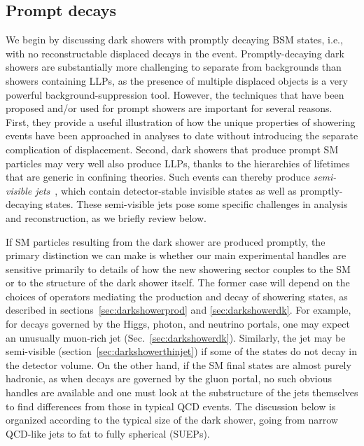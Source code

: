 \subsection{Prompt decays}
\label{sec:darkshowerprompt}

 We begin by discussing dark showers with promptly decaying BSM states, i.e., with no reconstructable displaced decays in the event.  Promptly-decaying dark showers are substantially more challenging to separate from backgrounds than showers containing LLPs, as the presence of multiple displaced objects is a very powerful background-suppression tool.  However, the techniques that have been proposed and/or used for prompt showers are important for several reasons. First, they provide a useful illustration of how the unique properties of showering events have been approached in analyses to date without introducing the separate complication of displacement.  Second, dark showers that produce prompt SM particles may very well also produce LLPs, thanks to the hierarchies of lifetimes that are generic in confining theories.  Such events can thereby produce {\em semi-visible jets}~\cite{Cohen:2015toa}, which contain detector-stable invisible states as well as promptly-decaying states.  These semi-visible jets pose some specific challenges in analysis and reconstruction, as we briefly review below.

If SM particles resulting from the dark shower are produced promptly, the primary distinction we can make is whether our main experimental handles are sensitive primarily to details of how the new showering sector couples to the SM or to the structure of the dark shower itself.
The former case will depend on the
choices of operators mediating the production and decay of showering states, as described in sections~\ref{sec:darkshowerprod} and \ref{sec:darkshowerdk}.
For example, for decays governed by the Higgs, photon, and neutrino portals, one may expect an unusually muon-rich jet (Sec.~\ref{sec:darkshowerdk}). Similarly, the jet may be semi-visible (section~\ref{sec:darkshowerthinjet}) if some of the states do not decay in the detector volume. On the other hand, if the SM final states are almost purely hadronic, as when decays are governed by the gluon portal, no such obvious handles are available and one must look at the substructure of the jets themselves to find differences from those in typical QCD events. The discussion below is organized according to the typical size of the dark shower, going from narrow QCD-like jets to fat to fully spherical (SUEPs).



